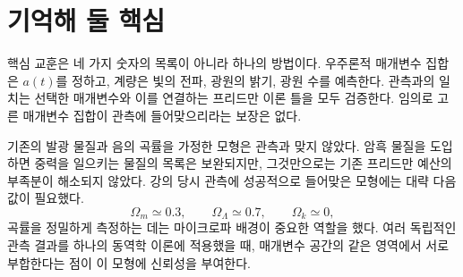 \begin{classroomqa}
\end{classroomqa}

\begin{classroomqa}
\end{classroomqa}

\section{기억해 둘 핵심}

핵심 교훈은 네 가지 숫자의 목록이 아니라 하나의 방법이다. 우주론적 매개변수 집합은 \(a(t)\)를 정하고, 계량은 빛의 전파, 광원의 밝기, 광원 수를 예측한다. 관측과의 일치는 선택한 매개변수와 이를 연결하는 프리드만 이론 틀을 모두 검증한다. 임의로 고른 매개변수 집합이 관측에 들어맞으리라는 보장은 없다.

기존의 발광 물질과 음의 곡률을 가정한 모형은 관측과 맞지 않았다. 암흑 물질을 도입하면 중력을 일으키는 물질의 목록은 보완되지만, 그것만으로는 기존 프리드만 예산의 부족분이 해소되지 않았다. 강의 당시 관측에 성공적으로 들어맞은 모형에는 대략 다음 값이 필요했다.
\begin{equation}
\Omega_m\simeq0.3,
\qquad
\Omega_\Lambda\simeq0.7,
\qquad
\Omega_k\simeq0,
\end{equation}
곡률을 정밀하게 측정하는 데는 마이크로파 배경이 중요한 역할을 했다. 여러 독립적인 관측 결과를 하나의 동역학 이론에 적용했을 때, 매개변수 공간의 같은 영역에서 서로 부합한다는 점이 이 모형에 신뢰성을 부여한다.
